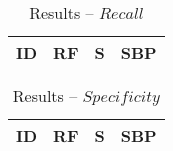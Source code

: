 \documentclass{llncs}
\begin{document}
\begin{table}[!ht]
\centering
\caption{Results -- $Recall$}
\begin{tabular}{r c c c}
  \hline
\textbf{ID} & \textbf{RF} & \textbf{S} & \textbf{SBP}\\
    \hline
    
\end{tabular}
\end{table}

\begin{table}[!ht]
\centering
\caption{Results -- $Specificity$}
\begin{tabular}{r c c c}
  \hline
\textbf{ID} & \textbf{RF} & \textbf{S} & \textbf{SBP}\\
    \hline
    
\end{tabular}
\end{table}
\end{document}
